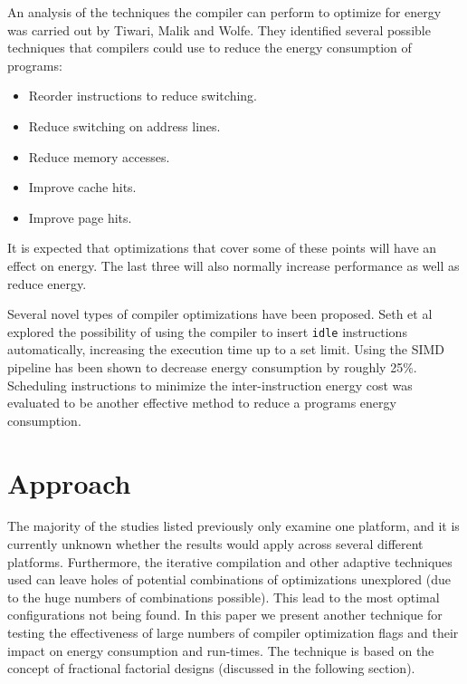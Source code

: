 \documentclass[twocolumn]{article}
\begin{document}
An analysis of the techniques the compiler can perform to optimize for energy was carried out by Tiwari, Malik and Wolfe\cite{CompilationTechniquesForLowEnergy}. They identified several possible techniques that compilers could use to reduce the energy consumption of programs:
\begin{itemize}
	\setlength{\itemsep}{-0.4em}
	\vspace{-2mm}

	\item Reorder instructions to reduce switching.
	\item Reduce switching on address lines.
	\item Reduce memory accesses.
	\item Improve cache hits.
	\item Improve page hits.
\end{itemize}

It is expected that optimizations that cover some of these points will have an effect on energy. The last three will also normally increase performance as well as reduce energy.

Several novel types of compiler optimizations have been proposed. Seth et al\cite{Seth2001} explored the possibility of using the compiler to insert \texttt{idle} instructions automatically, increasing the execution time up to a set limit. Using the SIMD pipeline has been shown to decrease energy consumption\cite{Ibrahim2009} by roughly 25\%. Scheduling instructions to minimize the inter-instruction energy cost was evaluated to be another effective method to reduce a programs energy consumption\cite{Parikh}.

\section{Approach}

The majority of the studies listed previously only examine one platform, and it is currently unknown whether the results would apply across several different platforms. Furthermore, the iterative compilation and other adaptive techniques used can leave holes of potential combinations of optimizations unexplored (due to the huge numbers of combinations possible). This lead to the most optimal configurations not being found. In this paper we present another technique for testing the effectiveness of large numbers of compiler optimization flags and their impact on energy consumption and run-times. The technique is based on the concept of fractional factorial designs (discussed in the following section).
\end{document}
